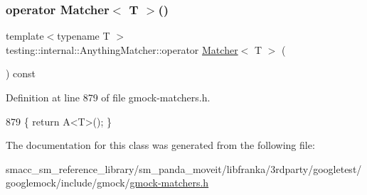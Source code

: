 \subsubsection{\texorpdfstring{operator Matcher$<$ T $>$()}{operator Matcher< T >()}}
{\footnotesize\ttfamily template$<$typename T $>$ \\
testing\+::internal\+::\+Anything\+Matcher\+::operator \hyperlink{classtesting_1_1Matcher}{Matcher}$<$ T $>$ (\begin{DoxyParamCaption}{ }\end{DoxyParamCaption}) const\hspace{0.3cm}{\ttfamily [inline]}}



Definition at line 879 of file gmock-\/matchers.\+h.


\begin{DoxyCode}
879 \{ \textcolor{keywordflow}{return} A<T>(); \}
\end{DoxyCode}


The documentation for this class was generated from the following file\+:\begin{DoxyCompactItemize}
\item 
smacc\+\_\+sm\+\_\+reference\+\_\+library/sm\+\_\+panda\+\_\+moveit/libfranka/3rdparty/googletest/googlemock/include/gmock/\hyperlink{gmock-matchers_8h}{gmock-\/matchers.\+h}\end{DoxyCompactItemize}
